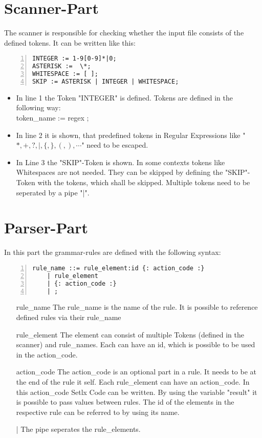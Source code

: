 \section{Scanner-Part}
The scanner is responsible for checking whether the input file consists of the defined tokens. It can be written like this:
\begin{lstlisting}[frame=single,numbers=left,basicstyle=\footnotesize]
INTEGER := 1-9[0-9]*|0;
ASTERISK :=  \*;
WHITESPACE := [ ];
SKIP := ASTERISK | INTEGER | WHITESPACE;
\end{lstlisting}
\begin{itemize}
	\item In line 1 the Token "INTEGER" is defined. Tokens are defined in the following way:\\
					token\_name := regex ;
	\item In line 2 it is shown, that predefined tokens in Regular Expressions like "$*,+,?,|,\{,\},(,),\cdots$" need to be escaped.
	\item In Line 3 the "SKIP"-Token is shown. In some contexts tokens like Whitespaces are not needed. They can be skipped by defining the "SKIP"-Token with the tokens, which shall be skipped. Multiple tokens need to be seperated by a pipe "|".
\end{itemize}

\section{Parser-Part}
In this part the grammar-rules are defined with the following syntax:
\begin{lstlisting}[frame=single,numbers=left,basicstyle=\footnotesize]
rule_name ::= rule_element:id {: action_code :} 
	| rule_element
	| {: action_code :} 
	| ;
\end{lstlisting}
\begin{itemize}
	\item[rule\_name] The rule\_name is the name of the rule. It is possible to reference defined rules via their rule\_name
	\item[rule\_element] The element can consist of multiple Tokens (defined in the scanner) and rule\_names. Each can have an id, which is possible to be used in the action\_code.
	\item[action\_code] The action\_code is an optional part in a rule. It needs to be at the end of the rule it self. Each rule\_element can have an action\_code. In this action\_code Setlx Code can be written. By using the variable "result" it is possible to pass values between rules. The id of the elements in the respective rule can be referred to by using its name.
	\item[|] The pipe seperates the rule\_elements.
\end{itemize}
\newpage
